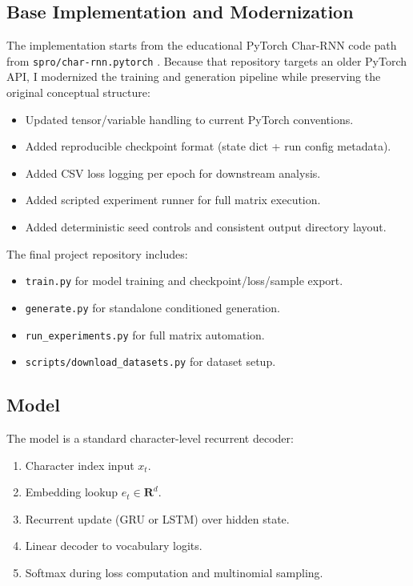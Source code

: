 \documentclass[10pt,twocolumn,letterpaper]{article}
\begin{document}
\subsection{Base Implementation and Modernization}
The implementation starts from the educational PyTorch Char-RNN code path from \texttt{spro/char-rnn.pytorch} \cite{spro2017}. Because that repository targets an older PyTorch API, I modernized the training and generation pipeline while preserving the original conceptual structure:
\begin{itemize}
\item Updated tensor/variable handling to current PyTorch conventions.
\item Added reproducible checkpoint format (state dict + run config metadata).
\item Added CSV loss logging per epoch for downstream analysis.
\item Added scripted experiment runner for full matrix execution.
\item Added deterministic seed controls and consistent output directory layout.
\end{itemize}

The final project repository includes:
\begin{itemize}
\item \texttt{train.py} for model training and checkpoint/loss/sample export.
\item \texttt{generate.py} for standalone conditioned generation.
\item \texttt{run\_experiments.py} for full matrix automation.
\item \texttt{scripts/download\_datasets.py} for dataset setup.
\end{itemize}

\subsection{Model}
The model is a standard character-level recurrent decoder:
\begin{enumerate}
\item Character index input $x_t$.
\item Embedding lookup $e_t \in \mathbf{R}^{d}$.
\item Recurrent update (GRU or LSTM) over hidden state.
\item Linear decoder to vocabulary logits.
\item Softmax during loss computation and multinomial sampling.
\end{enumerate}
\end{document}
